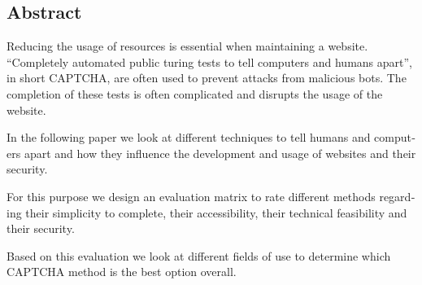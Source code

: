 

\begin{otherlanguage}{american}
	\chapter*{Abstract}
	Reducing the usage of resources is essential when maintaining a website. 
	“Completely automated public turing tests to tell computers and humans apart”, in short CAPTCHA, are often used to prevent attacks from malicious bots. 
	The completion of these tests is often complicated and disrupts the usage of the website. 

	In the following paper we look at different techniques to tell humans and computers apart and how they influence the development and usage of websites and their security. 
	
	For this purpose we design an evaluation matrix to rate different methods regarding their simplicity to complete, their accessibility, their technical feasibility and their security. 
	
	Based on this evaluation we look at different fields of use to determine which CAPTCHA method is the best option overall.

\end{otherlanguage}
